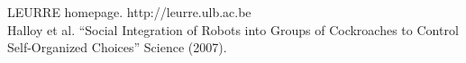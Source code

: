 \documentclass[letterpaper, oneside]{article}
\begin{document}


\noindent[1] LEURRE homepage. http://leurre.ulb.ac.be \\
\noindent[2] Halloy et al. ``Social Integration of Robots into Groups of Cockroaches to Control Self-Organized Choices'' Science (2007).
\end{document}
